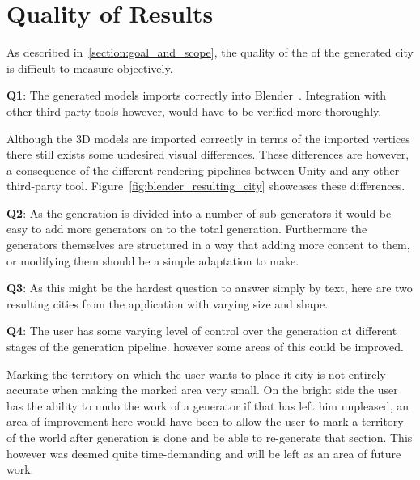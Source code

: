 \section{Quality of Results}

As described in~\ref{section:goal_and_scope}, the quality of the of the generated city is difficult to measure objectively.

\textbf{Q1}:
The generated models imports correctly into Blender~\cite{blender}.
Integration with other third-party tools however, would have to be verified more thoroughly. 

Although the 3D models are imported correctly in terms of the imported vertices there still exists some undesired visual differences.
These differences are however, a consequence of the different rendering pipelines between Unity and any other third-party tool.
Figure~\ref{fig:blender_resulting_city} showcases these differences.


\textbf{Q2}:
As the generation is divided into a number of sub-generators it would be easy to add more generators on to the total generation.
Furthermore the generators themselves are structured in a way that adding more content to them, or modifying them should be a simple adaptation to make. 

\textbf{Q3}:
As this might be the hardest question to answer simply by text, here are two resulting cities from the application with varying size and shape.

\textbf{Q4}:
The user has some varying level of control over the generation at different stages of the generation pipeline.
however some areas of this could be improved. 

Marking the territory on which the user wants to place it city is not entirely accurate when making the marked area very small. 
On the bright side the user has the ability to undo the work of a generator if that has left him unpleased, an area of improvement here would have been to allow the user to mark a territory of the world after generation is done and 	be able to re-generate that section.
This however was deemed quite time-demanding and will be left as an area of future work. 

